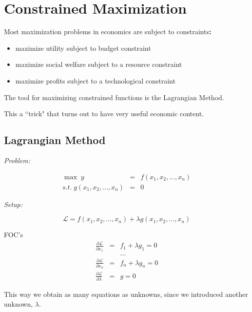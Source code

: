 \documentclass[11pt,english]{article}
\begin{document}
\section{Constrained Maximization}

Most maximization problems in economics are subject to constraints\textbf{:}

\begin{itemize}
\item maximize utility subject to budget constraint

\item maximize social welfare subject to a resource constraint

\item maximize profits subject to a technological constraint
\end{itemize}

The tool for maximizing constrained functions is the Lagrangian Method.

This a ``trick" that turns out to have very useful economic content.

\bigskip

\subsection{Lagrangian Method}

\bigskip

\textit{Problem:}

\begin{eqnarray*}
\max \;y &=&f(x_{1},x_{2},...,x_{n}) \\
s.t.\;g(x_{1},x_{2},...,x_{n}) &=&0
\end{eqnarray*}

\textit{Setup:}

\begin{equation*}
\mathcal{L} =f(x_{1},x_{2},...,x_{n})+\lambda g(x_{1},x_{2},...,x_{n})
\end{equation*}

FOC's 
\begin{eqnarray*}
\frac{\partial \mathcal{L} }{\partial x_{1}} &=&f_{1}+\lambda g_{1}=0 \\
&&... \\
\frac{\partial \mathcal{L} }{\partial x_{n}} &=&f_{n}+\lambda g_{n}=0 \\
\frac{\partial \mathcal{L} }{\partial \lambda } &=&g=0
\end{eqnarray*}

This way we obtain as many equations as unknowns, since we introduced
another unknown, $\lambda $.
\end{document}
